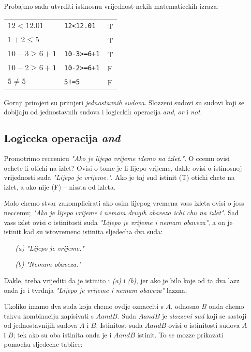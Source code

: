 Probajmo sada utvrditi istinosnu vrijednost nekih matematicckih izraza:

\begin{tabular}{lll}
	$12<12.01$ & \verb+12<12.01+ & T\\
	$1+2\leq 5$ & \verb*1+2<=5* & T\\
	$10-3\geq 6+1$ & \verb"10-3>=6+1" & T \\
	$10-2\geq 6+1$ & \verb"10-2>=6+1" & F \\
	$5\neq 5$ & \verb"5!=5" & F
\end{tabular}

Gornji primjeri su primjeri \emph{jednostavnih sudova}. Slozzeni
sudovi su sudovi koji se dobijaju od jednostavnih sudova i logicckih
operacija \emph{and}, \emph{or} i \emph{not}.

\subsection{Logiccka operacija \emph{and}}

Promotrimo reccenicu \emph{"Ako je lijepo vrijeme
idemo na izlet."}. O ccemu ovisi ochete li
otichi na izlet? Ovisi o tome je li lijepo vrijeme, dakle ovisi o
istinosnoj vrijednosti suda \emph{"Lijepo je vrijeme."}. Ako je
taj sud istinit (T) otichi chete na izlet, a ako nije (F) -- nissta
od izleta.

Malo chemo stvar zakomplicirati ako osim lijepog vremena vass izleta
ovisi o joss neccemu; \emph{"Ako je lijepo vrijeme i nemam drugih obaveza ichi chu na izlet"}.
Sad vass izlet ovisi o istinitosti suda \emph{"Lijepo je vrijeme i nemam obaveza"}, a on je istinit
kad su istovremeno istinita sljedecha dva suda:

\begin{itemize}
	\item[\emph{(a)}] \emph{"Lijepo je vrijeme."}
	\item[\emph{(b)}] \emph{"Nemam obaveza."}
\end{itemize}

Dakle, treba vrijediti da je istinito i \emph{(a)} i \emph{(b)},
jer ako je bilo koje od ta dva lazz onda je i tvrdnja \emph{"Lijepo
je vrijeme i nemam obaveza"} lazzna.

Ukoliko imamo dva suda koja chemo ovdje oznacciti s $A$, odnosno
$B$ onda chemo takvu kombinaciju zapisivati s $A and B$. Suda $A
and B$ je \emph{slozzeni sud} koji se sastoji od jednostavnijih
sudova $A$ i $B$. Istinitost suda $A and B$ ovisi o istinitosti
sudova $A$ i $B$; tek ako su oba istinita onda je i $A and B$
istinit. To se mozze prikazati pomochu sljedeche tablice:

